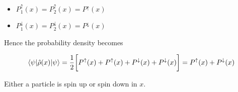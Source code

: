 			\begin{multicols}{2}
				\begin{itemize}
					\item $P_1^\uparrow(x)=P_2^\uparrow(x)=P^\uparrow(x)$
					\item $P_1^\downarrow(x)=P_2^\downarrow(x)=P^\downarrow(x)$
				\end{itemize}
			\end{multicols}

			Hence the probability density becomes

			$$\mel{\psi}{\hat{\rho}(x)}{\psi}=\frac{1}{2}\bigg[P^\uparrow(x)+P^\uparrow(x)+P^\downarrow(x)+P^\downarrow(x)\bigg]=P^\uparrow(x)+P^\downarrow(x)$$

			Either a particle is spin up or spin down in $x$.
